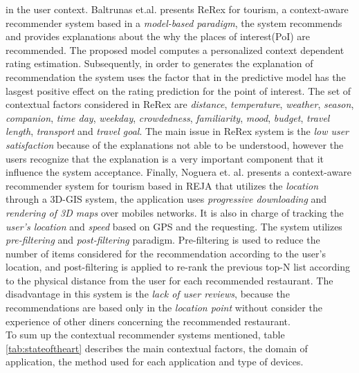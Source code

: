 in the user context.
Baltrunas et.al.\cite{baltrunas2011context} presents ReRex for tourism, 
a context-aware recommender system based in a 
\textit{model-based paradigm}, the system recommends and provides 
explanations about the why the  places of interest(PoI) are recommended. 
The proposed model computes a
personalized context dependent rating estimation. Subsequently, in
order to generates the explanation of recommendation the system uses
the factor that in the predictive model has the lasgest positive
effect on the rating prediction for the point of interest. The set of
contextual factors considered in ReRex are \textit{distance},
\textit{temperature}, \textit{weather}, \textit{season}, \textit{companion}, 
\textit{time day}, \textit{weekday}, \textit{crowdedness}, \textit{familiarity}, 
\textit{mood}, \textit{budget}, \textit{travel length}, \textit{transport} and
\textit{travel goal}. The main issue in ReRex system is the \textit{low user
satisfaction} because of the explanations not able to be understood,
however the users recognize that the explanation is a very important
component that it influence the system acceptance. 
Finally, Noguera et. al. \cite{noguera2012mobile} presents a context-aware
recommender system for tourism based in REJA that utilizes the 
\textit{location} through a 3D-GIS system, the application uses 
\textit{progressive downloading} and \textit{rendering of
3D maps} over mobiles networks. It is also in charge of tracking the
\textit{user's location} and \textit{speed} based on GPS and the requesting. 
The system utilizes \textit{pre-filtering} and \textit{post-filtering} paradigm. 
Pre-filtering is used to reduce the number of items considered for the
recommendation according to the user's location, and  post-filtering
is applied to re-rank the previous top-N list according to the
physical distance from the user for each recommended restaurant. The
disadvantage in this system is the \textit{lack of user reviews},
because the recommendations are based only in the \textit{location
point} without consider the experience of other diners concerning the
recommended restaurant.\\ To sum up the contextual recommender 
systems mentioned, table \ref{tab:stateoftheart} describes the main 
contextual factors, the domain of application, the method used for each 
application and type of devices.
